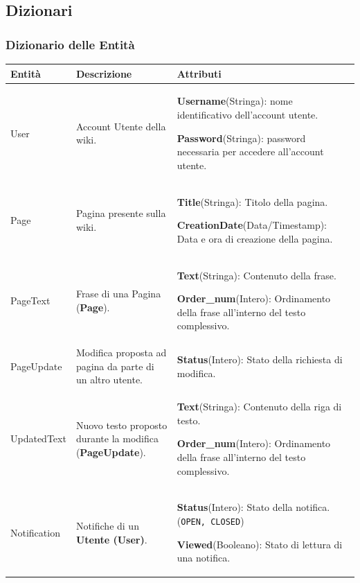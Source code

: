 \documentclass{article}
\begin{document}
	 
	{\subsection{Dizionari}}
	{\subsubsection{Dizionario delle Entità}}
	
	\begin{table}[H]
		\centering
		\small %
		\setlength{\tabcolsep}{6pt} %
		\renewcommand{\arraystretch}{1.2} %
		
		\begin{tabularx}{\textwidth}{|l|X|X|}
			\hline
			\textbf{Entità} & \textbf{Descrizione} & \textbf{Attributi} \\
			\hline
			User & Account Utente della wiki. & 
			\textbf{Username}(Stringa): nome identificativo dell'account utente.
			
			\textbf{Password}(Stringa): password necessaria
			per accedere all’account utente. \\
			\hline
			Page & Pagina presente sulla wiki. & 
			\textbf{Title}(Stringa): Titolo della pagina.
			
			\textbf{CreationDate}(Data/Timestamp): Data e ora di creazione della pagina.
			\\
			\hline
		    PageText & Frase di una Pagina (\textbf{Page}). &
			\textbf{Text}(Stringa): Contenuto della frase.
			
			\textbf{Order\_num}(Intero): Ordinamento della frase all'interno del testo complessivo.
			\\
			\hline
			PageUpdate & Modifica proposta ad pagina da parte di un altro utente. & 
			\textbf{Status}(Intero): Stato della richiesta di modifica.
			\\
			\hline
			UpdatedText & Nuovo testo proposto durante la modifica (\textbf{PageUpdate}). & 
			\textbf{Text}(Stringa): Contenuto della riga di testo.

			\textbf{Order\_num}(Intero): Ordinamento della frase all'interno del testo complessivo.
			\\
			\hline
			Notification & Notifiche di un \textbf{Utente (User)}.& 
			\textbf{Status}(Intero): Stato della notifica. (\texttt{OPEN, CLOSED})
			
		    \textbf{Viewed}(Booleano): Stato di lettura di una notifica.
		    

\end{tabularx}
\end{table}
\end{document}
